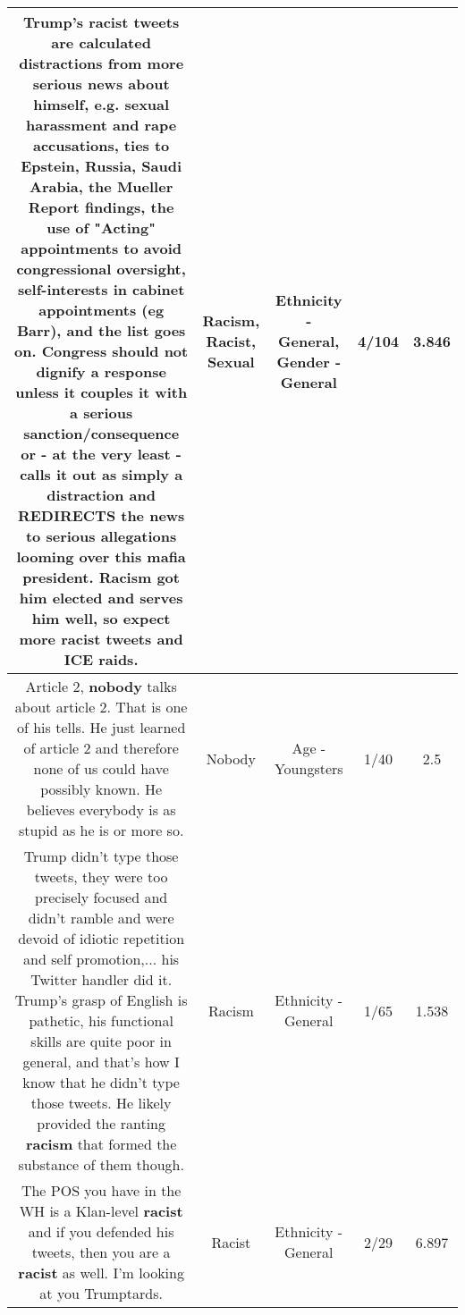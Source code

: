 \documentclass[11pt]{article}
\newlength\mylength
\begin{document}
\begin{center}
\begin{longtable}{|C{.65\mylength}|C{.30\mylength}|C{.12\mylength}|C{.12\mylength}|C{.12\mylength}|}
  \small Trump's \textbf{racist} tweets are calculated distractions from more serious news about himself, e.g. \textbf{sexual} harassment and rape accusations, ties to Epstein, Russia, Saudi Arabia, the Mueller Report findings, the use of "Acting" appointments to avoid congressional oversight, self-interests in cabinet appointments (eg Barr), and the list goes on.  Congress should not dignify a response unless it couples it with a serious sanction/consequence or -  at the very least -  calls it out as simply a distraction and REDIRECTS the news to serious allegations looming over this mafia president.  \textbf{Racism} got him elected and serves him well, so expect more \textbf{racist} tweets and ICE raids.\normalsize   & Racism, Racist, Sexual & Ethnicity - General, Gender - General & 4/104 & 3.846 \\  \hline
  \small Article 2, \textbf{nobody} talks about article 2. That is one of his tells. He just learned of article 2 and therefore none of us could have possibly known. He believes everybody is as stupid as he is or more so.\normalsize   & Nobody & Age - Youngsters & 1/40 & 2.5 \\  \hline
  \small Trump didn't type those tweets, they were too precisely focused and didn't ramble and were devoid of idiotic repetition and self promotion,... his Twitter handler did it. Trump's grasp of English is pathetic, his functional skills are quite poor in general, and that's how I know that he didn't type those tweets. He likely provided the ranting \textbf{racism} that formed the substance of them though.\normalsize   & Racism & Ethnicity - General & 1/65 & 1.538 \\  \hline
  \small The POS you have in the WH is a Klan-level \textbf{racist} and if you defended his tweets, then you are a \textbf{racist} as well. I'm looking at you Trumptards.\normalsize   & Racist & Ethnicity - General & 2/29 & 6.897 \\  \hline

\end{longtable}
\end{center}
\end{document}
